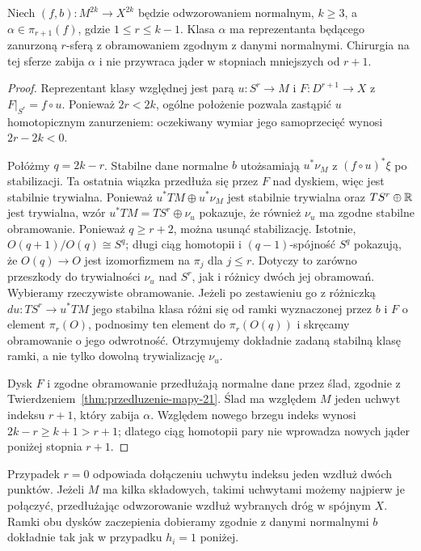 \begin{lemat}
\label{lem:ramy-ponizej-srodka-Wall-22}
Niech $(f,b):M^{2k}\to X^{2k}$ będzie
odwzorowaniem normalnym, $k\geq3$, a
$\alpha\in\pi_{r+1}(f)$, gdzie $1\leq r\leq k-1$.
Klasa $\alpha$ ma reprezentanta będącego
zanurzoną $r$-sferą z obramowaniem zgodnym
z danymi normalnymi. Chirurgia na tej sferze
zabija $\alpha$ i nie przywraca jąder
w stopniach mniejszych od $r+1$.
\end{lemat}
\begin{proof}
Reprezentant klasy względnej jest parą
$u:S^r\to M$ i $F:D^{r+1}\to X$ z
$F|_{S^r}=f\circ u$. Ponieważ
$2r<2k$, ogólne położenie pozwala
zastąpić $u$ homotopicznym zanurzeniem:
oczekiwany wymiar jego samoprzecięć
wynosi $2r-2k<0$.

Połóżmy $q=2k-r$. Stabilne dane normalne
$b$ utożsamiają $u^*\nu_M$ z
$(f\circ u)^*\xi$ po stabilizacji.
Ta ostatnia wiązka przedłuża się przez
$F$ nad dyskiem, więc jest stabilnie
trywialna. Ponieważ
$u^*TM\oplus u^*\nu_M$ jest stabilnie
trywialna oraz $TS^r\oplus\mathbb{R}$
jest trywialna, wzór
$u^*TM=TS^r\oplus\nu_u$ pokazuje,
że również $\nu_u$ ma zgodne stabilne
obramowanie. Ponieważ
$q\geq r+2$, można usunąć stabilizację.
Istotnie, $O(q+1)/O(q)\cong S^q$;
długi ciąg homotopii i $(q-1)$-spójność
$S^q$ pokazują, że $O(q)\to O$
jest izomorfizmem na $\pi_j$ dla
$j\leq r$. Dotyczy to zarówno przeszkody
do trywialności $\nu_u$ nad $S^r$,
jak i różnicy dwóch jej obramowań.
Wybieramy rzeczywiste obramowanie.
Jeżeli po zestawieniu go z różniczką
$du:TS^r\to u^*TM$ jego stabilna klasa
różni się od ramki wyznaczonej przez $b$
i $F$ o element $\pi_r(O)$, podnosimy
ten element do $\pi_r(O(q))$ i skręcamy
obramowanie o jego odwrotność.
Otrzymujemy dokładnie zadaną stabilną
klasę ramki, a nie tylko dowolną
trywializację $\nu_u$.

Dysk $F$ i zgodne obramowanie przedłużają
normalne dane przez ślad, zgodnie z
Twierdzeniem~\ref{thm:przedluzenie-mapy-21}.
Ślad ma względem $M$ jeden uchwyt indeksu
$r+1$, który zabija $\alpha$.
Względem nowego brzegu indeks wynosi
$2k-r\geq k+1>r+1$; dlatego ciąg
homotopii pary nie wprowadza nowych
jąder poniżej stopnia $r+1$.
\end{proof}

Przypadek $r=0$ odpowiada dołączeniu uchwytu
indeksu jeden wzdłuż dwóch punktów. Jeżeli
$M$ ma kilka składowych, takimi uchwytami
możemy najpierw je połączyć, przedłużając
odwzorowanie wzdłuż wybranych dróg w spójnym $X$.
Ramki obu dysków zaczepienia dobieramy
zgodnie z danymi normalnymi $b$ dokładnie
tak jak w przypadku $h_i=1$ poniżej.

